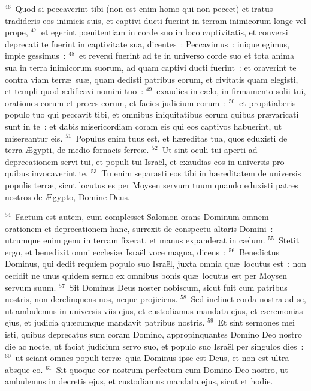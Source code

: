 ${}^{46}$~Quod si peccaverint tibi (non est enim homo qui non peccet) et iratus tradideris eos inimicis suis, et captivi ducti fuerint in terram inimicorum longe vel prope,
${}^{47}$~et egerint pœnitentiam in corde suo in loco captivitatis, et conversi deprecati te fuerint in captivitate sua, dicentes~: Peccavimus~: inique egimus, impie gessimus~:
${}^{48}$~et reversi fuerint ad te in universo corde suo et tota anima sua in terra inimicorum suorum, ad quam captivi ducti fuerint~: et oraverint te contra viam terr\ae\ su\ae , quam dedisti patribus eorum, et civitatis quam elegisti, et templi quod \ae dificavi nomini tuo~:
${}^{49}$~exaudies in c\ae lo, in firmamento solii tui, orationes eorum et preces eorum, et facies judicium eorum~:
${}^{50}$~et propitiaberis populo tuo qui peccavit tibi, et omnibus iniquitatibus eorum quibus pr\ae varicati sunt in te~: et dabis misericordiam coram eis qui eos captivos habuerint, ut misereantur eis.
${}^{51}$~Populus enim tuus est, et h\ae reditas tua, quos eduxisti de terra \AE gypti, de medio fornacis ferre\ae .
${}^{52}$~Ut sint oculi tui aperti ad deprecationem servi tui, et populi tui Isra\"el, et exaudias eos in universis pro quibus invocaverint te.
${}^{53}$~Tu enim separasti eos tibi in h\ae reditatem de universis populis terr\ae , sicut locutus es per Moysen servum tuum quando eduxisti patres nostros de \AE gypto, Domine Deus.


${}^{54}$~Factum est autem, cum complesset Salomon orans Dominum omnem orationem et deprecationem hanc, surrexit de conspectu altaris Domini~: utrumque enim genu in terram fixerat, et manus expanderat in c\ae lum.
${}^{55}$~Stetit ergo, et benedixit omni ecclesi\ae\ Isra\"el voce magna, dicens~:
${}^{56}$~Benedictus Dominus, qui dedit requiem populo suo Isra\"el, juxta omnia qu\ae\ locutus est~: non cecidit ne unus quidem sermo ex omnibus bonis qu\ae\ locutus est per Moysen servum suum.
${}^{57}$~Sit Dominus Deus noster nobiscum, sicut fuit cum patribus nostris, non derelinquens nos, neque projiciens.
${}^{58}$~Sed inclinet corda nostra ad se, ut ambulemus in universis viis ejus, et custodiamus mandata ejus, et c\ae remonias ejus, et judicia qu\ae cumque mandavit patribus nostris.
${}^{59}$~Et sint sermones mei isti, quibus deprecatus sum coram Domino, appropinquantes Domino Deo nostro die ac nocte, ut faciat judicium servo suo, et populo suo Isra\"el per singulos dies~:
${}^{60}$~ut sciant omnes populi terr\ae\ quia Dominus ipse est Deus, et non est ultra absque eo.
${}^{61}$~Sit quoque cor nostrum perfectum cum Domino Deo nostro, ut ambulemus in decretis ejus, et custodiamus mandata ejus, sicut et hodie.


